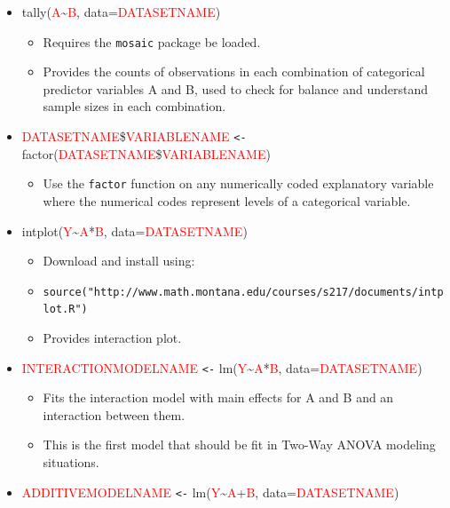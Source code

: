 \documentclass[]{book}
\providecommand{\tightlist}{%
  \setlength{\itemsep}{0pt}\setlength{\parskip}{0pt}}
\theoremstyle{definition}
\theoremstyle{definition}
\theoremstyle{remark}
\begin{document}
\begin{itemize}
\item
  tally(\textcolor{red}{A}\textasciitilde{}\textcolor{red}{B},
  data=\textcolor{red}{DATASETNAME})

  \begin{itemize}
  \item
    Requires the \texttt{mosaic} package be loaded.
  \item
    Provides the counts of observations in each combination of
    categorical predictor variables A and B, used to check for balance
    and understand sample sizes in each combination.
  \end{itemize}
\item
  \textcolor{red}{DATASETNAME}\$\textcolor{red}{VARIABLENAME}
  \texttt{\textless{}-}
  factor(\textcolor{red}{DATASETNAME}\$\textcolor{red}{VARIABLENAME})

  \begin{itemize}
  \tightlist
  \item
    Use the \texttt{factor} function on any numerically coded
    explanatory variable where the numerical codes represent levels of a
    categorical variable.
  \end{itemize}
\item
  intplot(\textcolor{red}{Y}\textasciitilde{}\textcolor{red}{A}*\textcolor{red}{B},
  data=\textcolor{red}{DATASETNAME})

  \begin{itemize}
  \item
    Download and install using:
  \item
    \texttt{source("http://www.math.montana.edu/courses/s217/documents/intplot.R")}
  \item
    Provides interaction plot.
  \end{itemize}
\item
  \textcolor{red}{INTERACTIONMODELNAME} \texttt{\textless{}-}
  lm(\textcolor{red}{Y}\textasciitilde{}\textcolor{red}{A}*\textcolor{red}{B},
  data=\textcolor{red}{DATASETNAME})

  \begin{itemize}
  \item
    Fits the interaction model with main effects for A and B and an
    interaction between them.
  \item
    This is the first model that should be fit in Two-Way ANOVA modeling
    situations.
  \end{itemize}
\item
  \textcolor{red}{ADDITIVEMODELNAME} \texttt{\textless{}-}
  lm(\textcolor{red}{Y}\textasciitilde{}\textcolor{red}{A}+\textcolor{red}{B},
  data=\textcolor{red}{DATASETNAME})


\end{itemize}
\end{document}
